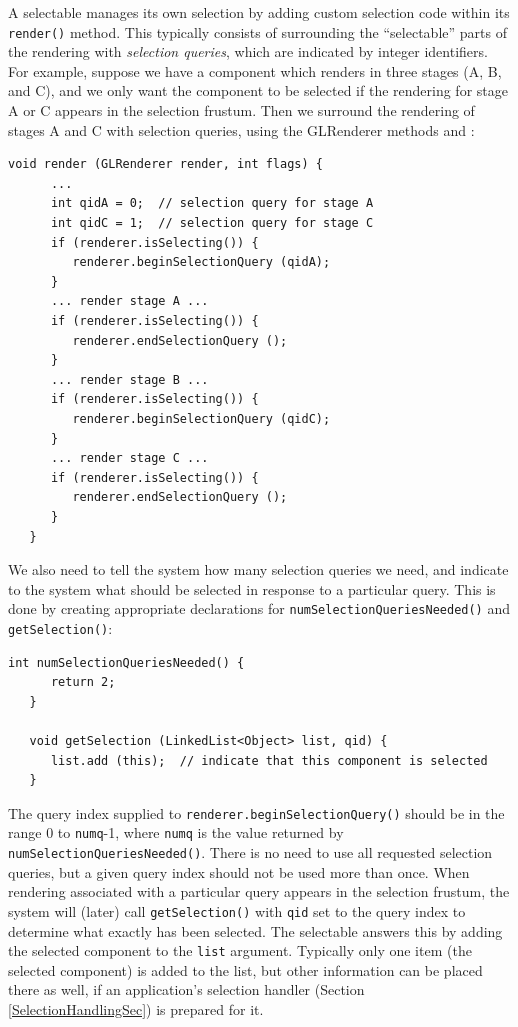 \documentclass{article}
\begin{document}
A selectable manages its own selection by adding custom selection code
within its {\tt render()} method. This typically consists of
surrounding the ``selectable'' parts of the rendering with {\it
selection queries}, which are indicated by integer identifiers.  For
example, suppose we have a component which renders in three stages (A,
B, and C), and we only want the component to be selected if the
rendering for stage A or C appears in the selection frustum. Then we
surround the rendering of stages A and C with selection queries, using
the GLRenderer methods 
and :
\begin{lstlisting}[]
   void render (GLRenderer render, int flags) {
      ...
      int qidA = 0;  // selection query for stage A
      int qidC = 1;  // selection query for stage C
      if (renderer.isSelecting()) {
         renderer.beginSelectionQuery (qidA);
      }
      ... render stage A ...
      if (renderer.isSelecting()) {
         renderer.endSelectionQuery ();
      }
      ... render stage B ...
      if (renderer.isSelecting()) {
         renderer.beginSelectionQuery (qidC);
      }
      ... render stage C ...
      if (renderer.isSelecting()) {
         renderer.endSelectionQuery ();
      }
   }
\end{lstlisting}
We also need to tell the system how many selection queries we
need, and indicate to the system what should be selected
in response to a particular query. This is done by creating
appropriate declarations for 
{\tt numSelectionQueriesNeeded()} and
{\tt getSelection()}:
\begin{lstlisting}[]
   int numSelectionQueriesNeeded() {
      return 2;
   }

   void getSelection (LinkedList<Object> list, qid) {
      list.add (this);  // indicate that this component is selected
   }
\end{lstlisting}
The query index supplied to {\tt renderer.beginSelectionQuery()}
should be in the range 0 to {\tt numq}-1, where {\tt numq} is the
value returned by {\tt numSelectionQueriesNeeded()}. There is no need
to use all requested selection queries, but a given query index should
not be used more than once. When rendering associated with a
particular query appears in the selection frustum, the system will
(later) call {\tt getSelection()} with {\tt qid} set to the query index to
determine what exactly has been selected. The selectable answers this
by adding the selected component to the {\tt list} argument.
Typically only one item (the selected component) is added to the list,
but other information can be placed there as well, if an
application's selection handler (Section \ref{SelectionHandlingSec})
is prepared for it.
\end{document}
